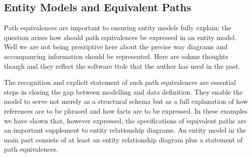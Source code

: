 \subsection{Entity Models and Equivalent Paths}
\begin{worktt}
Path equivalences are important to ensuring entity models fully explain; the question arises how should
path equivalences be expressed in an entity model. Well we are not being presriptive here about the precise way diagrams and accompanying information should be represented. Here are sokme thoughts though and they reflect the software ttols that the author has used in the past.
\end{worktt} 
\mynote {}
The recognition and explicit statement of such path equivalences are essential steps in closing the gap between modelling and data definition. They enable the model to serve not merely as a structural schema but as a full explanation of how references are to be phrased and how facts are to be expressed.
\mynote
In these examples we have shown that, however expressed,  the specifications of equivalent paths are
an important supplement to entity relationship diagrams. 
An entity model in the main part consists of at least an entity relationship diagram  
plus a statement of path equivalences.

